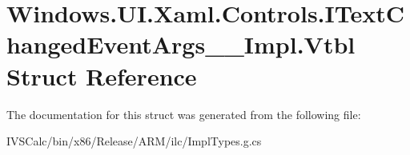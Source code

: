 \hypertarget{struct_windows_1_1_u_i_1_1_xaml_1_1_controls_1_1_i_text_changed_event_args_____impl_1_1_vtbl}{}\section{Windows.\+U\+I.\+Xaml.\+Controls.\+I\+Text\+Changed\+Event\+Args\+\_\+\+\_\+\+Impl.\+Vtbl Struct Reference}
\label{struct_windows_1_1_u_i_1_1_xaml_1_1_controls_1_1_i_text_changed_event_args_____impl_1_1_vtbl}


The documentation for this struct was generated from the following file\+:\begin{DoxyCompactItemize}
\item 
I\+V\+S\+Calc/bin/x86/\+Release/\+A\+R\+M/ilc/Impl\+Types.\+g.\+cs\end{DoxyCompactItemize}
